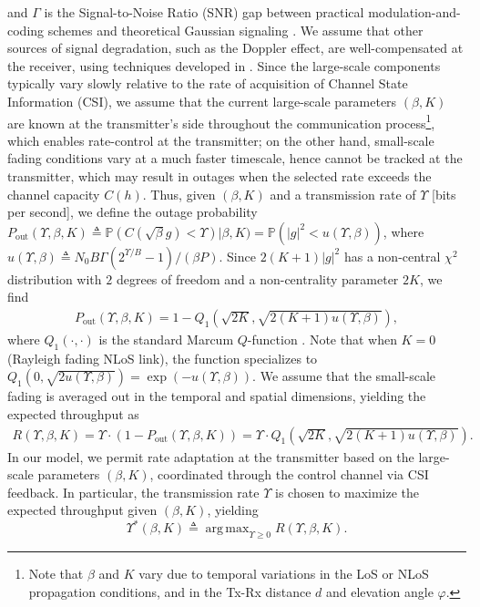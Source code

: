 \documentclass[12pt, draftcls, onecolumn]{IEEEtran}
\theoremstyle{plain}
\theoremstyle{definition}
\theoremstyle{remark}
\DeclareMathOperator*{\argmax}{arg\,max}
\begin{document}
and $\Gamma$ is the Signal-to-Noise Ratio (SNR) gap between practical modulation-and-coding schemes and theoretical Gaussian signaling \cite{Rician}. We assume that other sources of signal degradation, such as the Doppler effect, are well-compensated at the receiver, using techniques developed in \cite{Doppler}. Since the large-scale components typically vary slowly relative to the rate of acquisition of Channel State Information (CSI), we assume that the current large-scale parameters $(\beta,K)$ are known at the transmitter's side throughout the communication process\footnote{Note that $\beta$ and $K$ vary due to temporal variations in the LoS or NLoS propagation conditions, and in the Tx-Rx distance $d$ and elevation angle $\varphi$.}, which enables rate-control at the transmitter; on the other hand, small-scale fading conditions vary at a much faster timescale, hence cannot be tracked at the transmitter, which may result in outages when the selected rate exceeds the channel capacity $C(h)$. Thus, given $(\beta,K)$ and a transmission rate of $\Upsilon$ [bits per second], we define the outage probability $P_{\mathrm{out}}(\Upsilon,\beta,K) \triangleq \mathbb{P}(C(\sqrt{\beta}g){<}\Upsilon)|\beta,K) = \mathbb{P}\left(|g|^{2}{<}u(\Upsilon,\beta)\right)$, where $u(\Upsilon,\beta){\triangleq}N_{0}B\Gamma(2^{\Upsilon/B}{-}1)/(\beta P)$. Since $2(K{+}1)|g|^{2}$ has a non-central $\chi^2$ distribution with $2$ degrees of freedom and a non-centrality parameter $2K$, we find
\begin{align}
	P_{\mathrm{out}}(\Upsilon,\beta,K)=1-Q_{1}\left(\sqrt{2K},\sqrt{2(K+1)u(\Upsilon,\beta)}\right),
\end{align}
where $Q_{1}(\cdot,\cdot)$ is the standard Marcum $Q$-function \cite{Rician}. Note that when $K{=}0$ (Rayleigh fading NLoS link), the function specializes to $Q_{1}\left(0,\sqrt{2u(\Upsilon,\beta)}\right){=}\exp(-u(\Upsilon,\beta))$. We assume that the small-scale fading is averaged out in the temporal and spatial dimensions, yielding the expected throughput as
\begin{align}
	R(\Upsilon,\beta,K)=\Upsilon\cdot\left(1-P_{\mathrm{out}}(\Upsilon,\beta,K)\right)=\Upsilon\cdot Q_{1}\left(\sqrt{2K},\sqrt{2(K+1)u(\Upsilon,\beta)}\right).
\end{align}
In our model, we permit rate adaptation at the transmitter based on the large-scale parameters $(\beta,K)$, coordinated through the control channel via CSI feedback. In particular, the transmission rate $\Upsilon$ is chosen to maximize the expected throughput given $(\beta,K)$, yielding $$\Upsilon^{*}(\beta,K) \triangleq \argmax_{\Upsilon \geq 0}R(\Upsilon,\beta,K).$$
\end{document}
